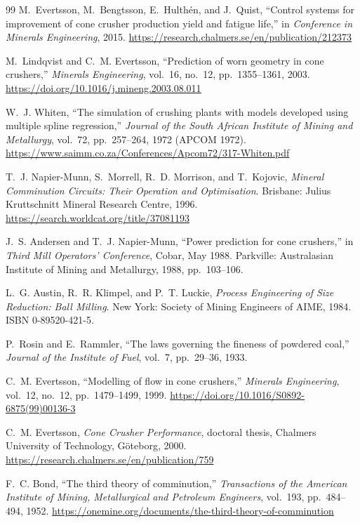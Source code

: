 \begin{thebibliography}{99}
 M.~Evertsson, M.~Bengtsson, E.~Hulth\'en, and J.~Quist, ``Control systems for improvement of cone crusher production yield and
fatigue life,'' in \emph{Conference in Minerals Engineering}, 2015. \url{https://research.chalmers.se/en/publication/212373}

 M.~Lindqvist and C.~M. Evertsson, ``Prediction of worn geometry in cone crushers,'' \emph{Minerals Engineering}, vol.~16,
no.~12, pp.~1355--1361, 2003. \url{https://doi.org/10.1016/j.mineng.2003.08.011}

 W.~J. Whiten, ``The simulation of crushing plants with models developed using multiple spline regression,'' \emph{Journal of the
South African Institute of Mining and Metallurgy}, vol.~72, pp.~257--264, 1972 (APCOM 1972).
\url{https://www.saimm.co.za/Conferences/Apcom72/317-Whiten.pdf}

 T.~J. Napier-Munn, S.~Morrell, R.~D. Morrison, and T.~Kojovic, \emph{Mineral Comminution Circuits: Their Operation and
Optimisation}. Brisbane: Julius Kruttschnitt Mineral Research Centre, 1996. \url{https://search.worldcat.org/title/37081193}

 J.~S. Andersen and T.~J. Napier-Munn, ``Power prediction for cone crushers,'' in \emph{Third Mill Operators' Conference},
Cobar, May 1988. Parkville: Australasian Institute of Mining and Metallurgy, 1988, pp.~103--106.

 L.~G. Austin, R.~R. Klimpel, and P.~T. Luckie, \emph{Process Engineering of Size Reduction: Ball Milling}. New York:
Society of Mining Engineers of AIME, 1984. ISBN 0-89520-421-5.

 P.~Rosin and E.~Rammler, ``The laws governing the fineness of powdered coal,'' \emph{Journal of the Institute of Fuel},
vol.~7, pp.~29--36, 1933.

 C.~M. Evertsson, ``Modelling of flow in cone crushers,'' \emph{Minerals Engineering}, vol.~12, no.~12, pp.~1479--1499, 1999.
\url{https://doi.org/10.1016/S0892-6875(99)00136-3}

 C.~M. Evertsson, \emph{Cone Crusher Performance}, doctoral thesis, Chalmers University of Technology, G\"oteborg, 2000.
\url{https://research.chalmers.se/en/publication/759}

 F.~C. Bond, ``The third theory of comminution,'' \emph{Transactions of the American Institute of Mining, Metallurgical and Petroleum
Engineers}, vol.~193, pp.~484--494, 1952. \url{https://onemine.org/documents/the-third-theory-of-comminution}


\end{thebibliography}
